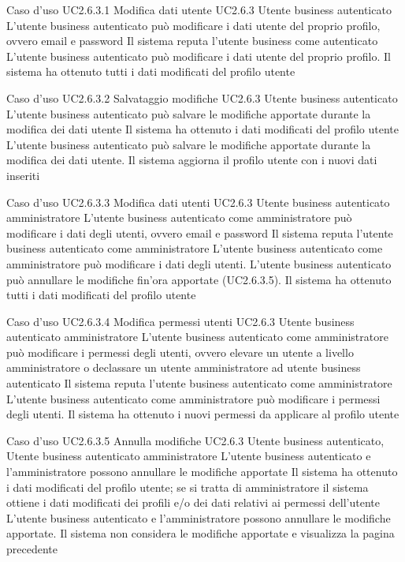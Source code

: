 \UCtitle
{Caso d'uso UC2.6.3.1}
{Modifica dati utente}
\UC
{UC2.6.3}
{Utente business autenticato}
{L'utente business autenticato può modificare i dati utente del proprio profilo, ovvero email e password}
{Il sistema reputa l'utente business come autenticato}
\scenario
{L'utente business autenticato può modificare i dati utente del proprio profilo.}
\post
{Il sistema ha ottenuto tutti i dati modificati del profilo utente}

\UCtitle
{Caso d'uso UC2.6.3.2}
{Salvataggio modifiche}
\UC
{UC2.6.3}
{Utente business autenticato}
{L'utente business autenticato può salvare le modifiche apportate durante la modifica dei dati utente}
{Il sistema ha ottenuto i dati modificati del profilo utente}
\scenario
{L'utente business autenticato può salvare le modifiche apportate durante la modifica dei dati utente.}
\post
{Il sistema aggiorna il profilo utente con i nuovi dati inseriti}

\UCtitle
{Caso d'uso UC2.6.3.3}
{Modifica dati utenti}
\UC
{UC2.6.3}
{Utente business autenticato amministratore}
{L'utente business autenticato come amministratore può modificare i dati degli utenti, ovvero email e password}
{Il sistema reputa l'utente business autenticato come amministratore}
\scenario
{L'utente business autenticato come amministratore può modificare i dati degli utenti.}
\estensioni
{L'utente business autenticato può annullare le modifiche fin'ora apportate (UC2.6.3.5).}
\post
{Il sistema ha ottenuto tutti i dati modificati del profilo utente}

\UCtitle
{Caso d'uso UC2.6.3.4}
{Modifica permessi utenti}
\UC
{UC2.6.3}
{Utente business autenticato amministratore}
{L'utente business autenticato come amministratore può modificare i permessi degli utenti, ovvero elevare un utente a livello amministratore o declassare un utente amministratore ad utente business autenticato}
{Il sistema reputa l'utente business autenticato come amministratore}
\scenario
{L'utente business autenticato come amministratore può modificare i permessi degli utenti.}
\post
{Il sistema ha ottenuto i nuovi permessi da applicare al profilo utente}

\UCtitle
{Caso d'uso UC2.6.3.5}
{Annulla modifiche}
\UC
{UC2.6.3}
{Utente business autenticato, Utente business autenticato amministratore}
{L'utente business autenticato e l'amministratore possono annullare le modifiche apportate}
{Il sistema ha ottenuto i dati modificati del profilo utente; se si tratta di amministratore il sistema ottiene i dati modificati dei profili e/o dei dati relativi ai permessi dell'utente}
\scenario
{L'utente business autenticato e l'amministratore possono annullare le modifiche apportate.}
\post
{Il sistema non considera le modifiche apportate e visualizza la pagina precedente}